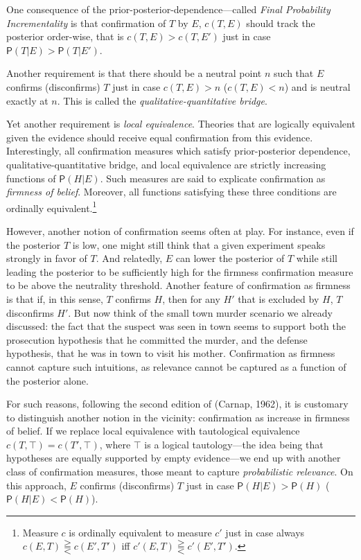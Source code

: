 \documentclass[
  10pt,
  dvipsnames,enabledeprecatedfontcommands]{scrartcl}
\newcommand{\pr}[1]{\mathsf{P}(#1)}
\begin{document}
One consequence of the prior-posterior-dependence---called
\emph{Final Probability Incrementality} is that confirmation of \(T\) by
\(E\), \(c(T,E)\) should track the posterior order-wise, that is
\(c(T,E)>c(T,E')\) just in case \(\pr{T\vert E} > \pr{T\vert E'}\).

Another requirement is that there should be a neutral point \(n\) such
that \(E\) confirms (disconfirms) \(T\) just in case \(c(T,E)>n\)
(\(c(T,E)<n\)) and is neutral exactly at \(n\). This is called the
\emph{qualitative-quantitative bridge}.

Yet another requirement is \emph{local equivalence}. Theories that are
logically equivalent given the evidence should receive equal
confirmation from this evidence. Interestingly, all confirmation
measures which satisfy prior-posterior dependence,
qualitative-quantitative bridge, and local equivalence are strictly
increasing functions of \(\pr{H \vert E}\). Such measures are said to
explicate confirmation as \emph{firmness of belief}. Moreover, all
functions satisfying these three conditions are ordinally
equivalent.\footnote{Measure $c$ is ordinally equivalent to measure $c'$ just in case always $c(E , T) \gtreqqless c(E', T')$ iff $c'(E , T) \gtreqqless c'(E' , T')$.}

However, another notion of confirmation seems often at play. For
instance, even if the posterior \(T\) is low, one might still think that
a given experiment speaks strongly in favor of \(T\). And relatedly,
\(E\) can lower the posterior of \(T\) while still leading the posterior
to be sufficiently high for the firmness confirmation measure to be
above the neutrality threshold. Another feature of confirmation as
firmness is that if, in this sense, \(T\) confirms \(H\), then for any
\(H'\) that is excluded by \(H\), \(T\) disconfirms \(H'\). But now
think of the small town murder scenario we already discussed: the fact
that the suspect was seen in town seems to support both the prosecution
hypothesis that he committed the murder, and the defense hypothesis,
that he was in town to visit his mother. Confirmation as firmness cannot
capture such intuitions, as relevance cannot be captured as a function
of the posterior alone.

For such reasons, following the second edition of (Carnap, 1962), it is
customary to distinguish another notion in the vicinity: confirmation as
increase in firmness of belief. If we replace local equivalence with
tautological equivalence \(c(T, \top) = c(T', \top)\), where \(\top\) is
a logical tautology---the idea being that hypotheses are equally
supported by empty evidence---we end up with another class of
confirmation measures, those meant to capture
\emph{probabilistic relevance}. On this approach, \(E\) confirms
(disconfirms) \(T\) just in case \(\pr{H \vert E} > \pr{H}\)
(\(\pr{H \vert E} < \pr{H}\)).
\end{document}
